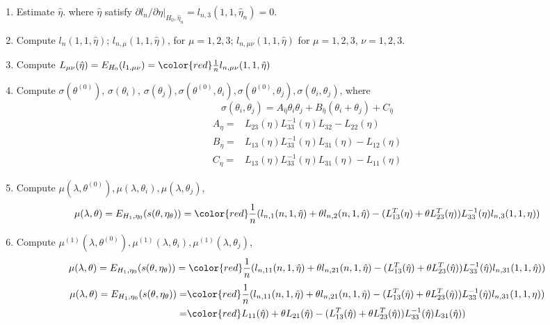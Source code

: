 \documentclass{article}
\begin{document}
\begin{enumerate}[step 1]
\item Estimate $\hat{\eta}$. where $\hat{\eta}$ satisfy $\partial l_n/\partial \eta|_{H_0,\hat{\eta}_n}= l_{n,3}(1,1,\hat{\eta}_n)=0$.
\item Compute $l_n(1,1,\hat{\eta})$; $l_{n,\mu}(1,1,\hat{\eta})$, for $\mu= 1,2,3$; $l_{n,\mu\nu}(1,1,\hat{\eta})$ for $\mu= 1,2,3$, $\nu=1,2,3$.
\item Compute $L_{\mu\nu}(\hat{\eta}) = E_{H_0}(l_{1,{\mu\nu}}) ={\color{red} \frac{1}{n}l_{n,\mu\nu}(1,1,\hat{\eta}) }$
\item Compute $\sigma(\theta^{(0)})$, $\sigma(\theta_i)$, $\sigma(\theta_j), \sigma(\theta^{(0)},\theta_i), \sigma(\theta^{(0)},\theta_j), \sigma(\theta_i,\theta_j)$, where $$\sigma(\theta_i,\theta_j) =A_{\hat{\eta}}\theta_i\theta_j+B_{\hat{\eta}}(\theta_i+\theta_j)+C_{\hat{\eta}}$$
\begin{align*}
 A_\eta =& L_{23}(\eta)L_{33}^{-1}(\eta)L_{32}-L_{22}(\eta)\\
 B_\eta =& L_{13}(\eta)L_{33}^{-1}(\eta)L_{31}(\eta)-L_{12}(\eta)\\
 C_\eta =& L_{13}(\eta)L_{33}^{-1}(\eta)L_{31}(\eta)-L_{11}(\eta)
\end{align*}
\item Compute $\mu(\lambda,\theta^{(0)}),\mu(\lambda,\theta_i),\mu(\lambda,\theta_j)$,
$$\mu(\lambda,\theta)= E_{H_1,\eta_0}(s(\theta,\eta_{\theta}))= {\color{red} \frac{1}{n}(l_{n,1}(n,1,\hat{\eta})+\theta l_{n,2}(n,1,\hat{\eta})- (L_{13}^T(\eta)+\theta L_{23}^T(\eta))L_{33}^{-1}(\eta)l_{n,3}(1,1,\eta))}$$
\item Compute $\mu^{(1)}(\lambda,\theta^{(0)}),\mu^{(1)}(\lambda,\theta_i),\mu^{(1)}(\lambda,\theta_j)$,
$$\mu(\lambda,\theta)= E_{H_1,\eta_0}(s(\theta,\eta_{\theta}))= {\color{red} \frac{1}{n}(l_{n,11}(n,1,\hat{\eta})+\theta l_{n,21}(n,1,\hat{\eta})- (L_{13}^T(\hat{\eta})+\theta L_{23}^T(\hat{\eta}))L_{33}^{-1}(\hat{\eta})l_{n,31}(1,1,\hat{\eta}))}$$
\begin{align*}
\mu(\lambda,\theta)= E_{H_1,\eta_0}(s(\theta,\eta_{\theta}))=& {\color{red} \frac{1}{n}(l_{n,11}(n,1,\hat{\eta})+\theta l_{n,21}(n,1,\hat{\eta})- (L_{13}^T(\hat{\eta})+\theta L_{23}^T(\hat{\eta}))L_{33}^{-1}(\hat{\eta})l_{n,31}(1,1,\eta))}\\
= &{\color{red} L_{11}(\hat{\eta})+\theta L_{21}(\hat{\eta})- (L_{13}^T(\hat{\eta})+\theta L_{23}^T(\hat{\eta}))L_{33}^{-1}(\hat{\eta})L_{31}(\hat{\eta}))}
\end{align*}


\end{enumerate}
\end{document}
